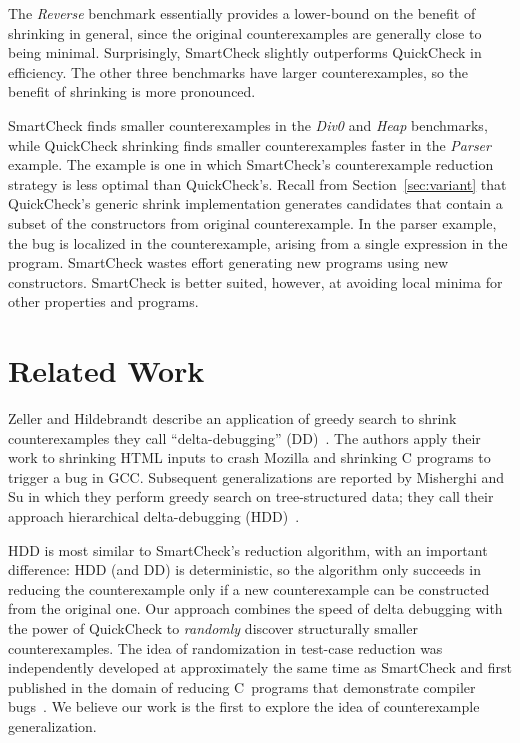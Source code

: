 \documentclass{sigplanconf}
\begin{document}
The \emph{Reverse} benchmark essentially provides a lower-bound on the benefit of
shrinking in general, since the original counterexamples are generally close to
being minimal.  Surprisingly, SmartCheck slightly outperforms QuickCheck in
efficiency.  The other three benchmarks have larger counterexamples, so the
benefit of shrinking is more pronounced.

SmartCheck finds smaller counterexamples in the \emph{Div0} and \emph{Heap}
benchmarks, while QuickCheck shrinking finds smaller counterexamples faster in
the \emph{Parser} example.  The example is one in which SmartCheck's
counterexample reduction strategy is less optimal than QuickCheck's.  Recall
from Section~\ref{sec:variant} that QuickCheck's generic shrink implementation
generates candidates that contain a subset of the constructors from original
counterexample.  In the parser example, the bug is localized in the
counterexample, arising from a single expression in the program.  SmartCheck
wastes effort generating new programs using new constructors. SmartCheck is
better suited, however, at avoiding local minima for other properties and
programs.

\section{Related Work}\label{sec:related}

Zeller and Hildebrandt describe an application of greedy search to shrink
counterexamples they call ``delta-debugging'' (DD)~\cite{dd}.  The authors apply
their work to shrinking HTML inputs to crash Mozilla and shrinking C programs to
trigger a bug in GCC.  Subsequent generalizations are reported by Misherghi and
Su in which they perform greedy search on tree-structured data; they call their
approach hierarchical delta-debugging (HDD)~\cite{hdd}.

HDD is most similar to SmartCheck's reduction algorithm, with an important
difference: HDD (and DD) is deterministic, so the algorithm only succeeds in
reducing the counterexample only if a new counterexample can be constructed from
the original one.  Our approach combines the speed of delta debugging with the
power of QuickCheck to \emph{randomly} discover structurally smaller
counterexamples.  The idea of randomization in test-case reduction was
independently developed at approximately the same time as SmartCheck and first
published in the domain of reducing C~programs that demonstrate compiler
bugs~\cite{regehr}. We believe our work is the first to explore
the idea of counterexample generalization.
\end{document}
